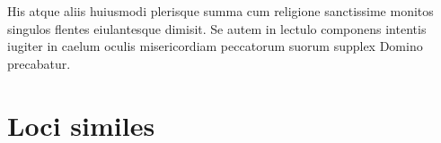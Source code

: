 \documentclass[a5paper,twoside]{article}
\begin{document}
His atque aliis huiusmodi plerisque summa cum religione sanctissime monitos singulos flentes eiulantesque  dimisit.  Se autem in lectulo componens intentis iugiter in caelum oculis misericordiam peccatorum suorum supplex  Domino precabatur.


\endnumbering

\newpage

\section*{Loci similes}
\end{document}
